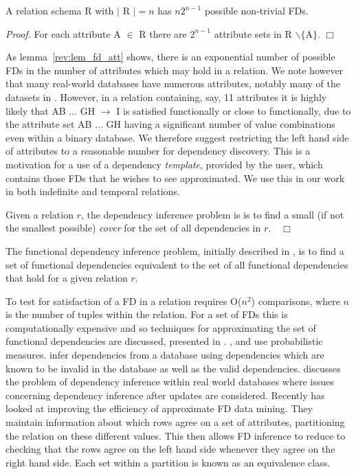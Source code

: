 \begin{lemma}\label{rev:lem_fd_att}
\begin{rm}
A relation schema R with $\mid$ R $\mid = n$ has $n2^{n-1}$ possible
non-trivial FDs.
\end{rm}
\end{lemma}


{\em Proof.} For each attribute A $\in$ R there are $2^{n-1}$ attribute
sets in R $\backslash \{$A$\}$. $\Box$

As lemma~\ref{rev:lem_fd_att} shows, there is an exponential number of
possible FDs in the number of attributes which may hold in a
relation. We note however that many real-world databases have numerous
attributes,  notably many of the datasets in \cite{bkm98}. 
However, in a relation
containing, say, 11 attributes it is highly likely that AB $\ldots$ GH
$\to$ I is satisfied functionally or close to functionally, due to the
attribute set AB $\ldots$ GH having a significant number of value
combinations even within a binary database. We therefore
suggest restricting the left hand side of attributes to a reasonable
number for dependency discovery. This is a motivation
for a use of a dependency {\em template}, provided by the user, which
contains those FDs that he wishes to see approximated. We use this in
our work in both indefinite and temporal relations. 

\begin{definition}
\begin{rm}
Given a relation $r$,  the  dependency inference problem is is to 
find a small (if not the smallest possible) {\em cover} for the set of 
all dependencies in $r$.$\quad\Box$
\end{rm}
\end{definition}


The functional dependency inference problem,  initially described in
\cite{mr86}, is to find a set of functional dependencies equivalent to
the set of all functional dependencies that hold for a given relation
$r$.  

To test for satisfaction of a FD in a
relation requires O($n^2$) comparisons, where $n$ is the number of
tuples within the relation.  For a set of FDs this
is computationally expensive and so techniques for approximating the
set of functional dependencies are discussed, presented in
\cite{mr94,km95,psm93,sf93,schl93,she91}. \cite{schl93}, \cite{sf93}
and \cite{psm93} use probabilistic measures.  \cite{sf93}  
infer dependencies from a database using dependencies which are known to
be invalid in the database as well as the valid
dependencies. \cite{bb95} discusses the problem of dependency
inference within real 
world databases where issues concerning dependency inference after
updates are considered. Recently
\cite{hkp98} has looked at improving the efficiency
of approximate FD data mining. They maintain information about which
rows agree on a set of attributes, partitioning the relation on these
different values. This then allows FD inference to
reduce to checking that the rows agree on the left hand side whenever
they agree on the right hand side. Each set within a partition is
known as an equivalence class.

